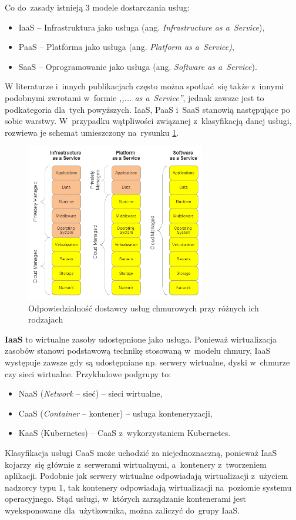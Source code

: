 \documentclass[12pt,a4paper,twoside,titlepage,openright]{book}
\begin{document}
Co do~zasady istnieją 3 modele dostarczania usług:
\begin{itemize}
\item IaaS -- Infrastruktura jako usługa (ang. \textit{Infrastructure as a~Service}),
\item PaaS -- Platforma jako usługa (ang. \textit{Platform as a~Service)},
\item SaaS -- Oprogramowanie jako usługa (ang. \textit{Software as a~Service}).
\end{itemize}
W literaturze i~innych publikacjach często można spotkać~się także z~innymi podobnymi zwrotami w~formie \textit{,,... as a~Service''}, jednak zawsze jest to podkategoria dla~tych powyższych. IaaS, PaaS i~SaaS stanowią następujące po sobie warstwy. W~przypadku wątpliwości związanej z~klasyfikacją danej usługi, rozwiewa je schemat umieszczony na~rysunku \ref{fig:iaas-paas-saas}.

\begin{figure}[h]
	\centering
			\includegraphics[width=0.7\textwidth]{iaas-paas-saas.png}
		\caption{Odpowiedzialność dostawcy usług chmurowych przy różnych ich rodzajach \cite{iotArchitects}}
		\label{fig:iaas-paas-saas}
\end{figure}

\textbf{IaaS} to wirtualne zasoby udostępnione jako usługa. Ponieważ wirtualizacja zasobów stanowi podstawową technikę stosowaną w~modelu chmury, IaaS występuje zawsze gdy są udostępniane np. serwery wirtualne, dyski w~chmurze czy sieci wirtualne. Przykładowe podgrupy to:
\begin{itemize}
\item NaaS (\textit{Network} -- sieć) -- sieci wirtualne,
\item CaaS (\textit{Container} -- kontener) -- usługa konteneryzacji,
\item KaaS (Kubernetes) -- CaaS z~wykorzystaniem Kubernetes.
\end{itemize}
Klasyfikacja usługi CaaS może uchodzić za niejednoznaczną, ponieważ IaaS kojarzy~się głównie z~serwerami wirtualnymi, a~kontenery z~tworzeniem aplikacji. Podobnie jak serwery wirtualne odpowiadają wirtualizacji z~użyciem nadzorcy typu 1, tak kontenery odpowiadają wirtualizacji na~poziomie systemu operacyjnego. Stąd usługi, w~których zarządzanie kontenerami jest wyeksponowane dla~użytkownika, można zaliczyć do~grupy IaaS.
\end{document}
